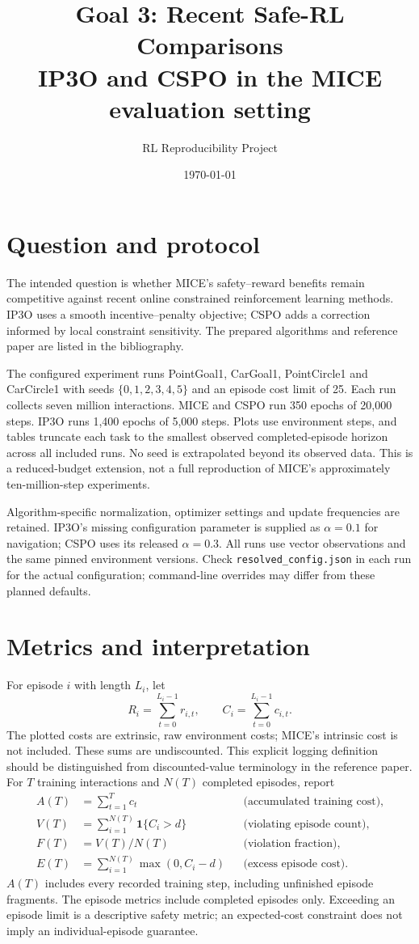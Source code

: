 \documentclass[11pt,a4paper]{article}
\title{Goal 3: Recent Safe-RL Comparisons\\\large IP3O and CSPO in the MICE evaluation setting}
\author{RL Reproducibility Project}
\date{\today}
\begin{document}
\maketitle

\section{Question and protocol}
The intended question is whether MICE's safety--reward benefits remain competitive
against recent online constrained reinforcement learning methods.
IP3O uses a smooth incentive--penalty objective; CSPO adds a correction informed
by local constraint sensitivity. The prepared algorithms and reference paper are
listed in the bibliography.

The configured experiment runs PointGoal1, CarGoal1, PointCircle1 and CarCircle1 with seeds
$\{0,1,2,3,4,5\}$ and an episode cost limit of 25. Each run collects seven million interactions. MICE and CSPO run 350 epochs of 20,000 steps. IP3O runs 1,400 epochs of 5,000 steps. Plots use environment steps, and tables
truncate each task to the smallest observed completed-episode horizon across
all included runs. No seed is extrapolated beyond its observed data.
This is a reduced-budget extension, not a full reproduction of MICE's
approximately ten-million-step experiments.

Algorithm-specific normalization, optimizer settings and update frequencies are
retained. IP3O's missing configuration parameter is supplied as $\alpha=0.1$
for navigation; CSPO uses its released $\alpha=0.3$.
All runs use vector observations and the same pinned environment versions.
Check \texttt{resolved\_config.json} in each run for the actual configuration;
command-line overrides may differ from these planned defaults.

\section{Metrics and interpretation}
For episode $i$ with length $L_i$, let
\[
R_i=\sum_{t=0}^{L_i-1}r_{i,t},\qquad C_i=\sum_{t=0}^{L_i-1}c_{i,t}.
\]
The plotted costs are extrinsic, raw environment costs; MICE's intrinsic cost
is not included. These sums are undiscounted. This explicit logging definition
should be distinguished from discounted-value terminology in the reference paper.
For $T$ training interactions and $N(T)$ completed episodes, report
\begin{align*}
A(T)&=\sum_{t=1}^{T} c_t &&\text{(accumulated training cost)},\\
V(T)&=\sum_{i=1}^{N(T)}\mathbf{1}\{C_i>d\} &&\text{(violating episode count)},\\
F(T)&=V(T)/N(T) &&\text{(violation fraction)},\\
E(T)&=\sum_{i=1}^{N(T)}\max(0,C_i-d) &&\text{(excess episode cost)}.
\end{align*}
$A(T)$ includes every recorded training step, including unfinished episode fragments.
The episode metrics include completed episodes only. Exceeding an episode limit
is a descriptive safety metric; an expected-cost constraint does not imply an
individual-episode guarantee.
\end{document}
